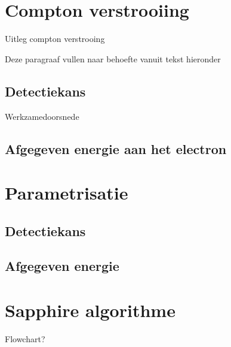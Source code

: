 \documentclass[a4paper,11pt]{article}
\begin{document}
\section{Compton verstrooiing}
Uitleg compton verstrooing

Deze paragraaf vullen naar behoefte vanuit tekst hieronder
\subsection{Detectiekans}
Werkzamedoorsnede
\subsection{Afgegeven energie aan het electron}

\section{Parametrisatie}
\subsection{Detectiekans}
\subsection{Afgegeven energie}

\section{Sapphire algorithme}
Flowchart?


{}

\end{document}
